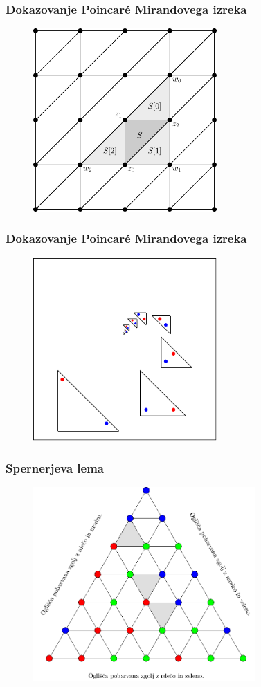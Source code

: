 \documentclass[t]{beamer} %
\begin{document}
\begin{frame}
\frametitle{Dokazovanje Poincar\'{e}  Mirandovega izreka}
\begin{figure}
\includegraphics[width=7cm]{sosed.pdf}
\end{figure}
\end{frame}

\begin{frame}
\frametitle{Dokazovanje Poincar\'{e}  Mirandovega izreka}
\begin{figure}
\includegraphics[width=7cm]{konvergenca.pdf}
\end{figure}
\end{frame}

\begin{frame}
\frametitle{Spernerjeva lema}
\begin{figure}
\includegraphics[width=8.5cm]{spernerjevo_barvanje.pdf}
\end{figure}
\end{frame}
\end{document}
